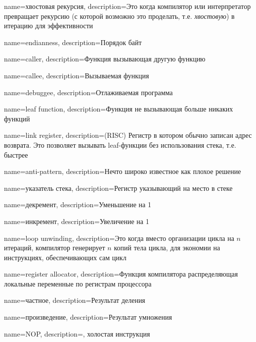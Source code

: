 {
  name=хвостовая рекурсия,
  description={Это когда компилятор или интерпретатор превращает рекурсию 
  (с которой возможно это проделать, т.е. \emph{хвостовую}) в итерацию для эффективности}
}

{
  name=endianness,
  description={Порядок байт}
}

{
  name=caller,
  description={Функция вызывающая другую функцию}
}

{
  name=callee,
  description={Вызываемая функция}
}

{
  name=debuggee,
  description={Отлаживаемая программа}
}

{
  name=leaf function,
  description={Функция не вызывающая больше никаких функций}
}

{
  name=link register,
  description=(RISC) {Регистр в котором обычно записан адрес возврата.
  Это позволяет вызывать leaf-функции без использования стека, т.е. быстрее}
}

{
  name=anti-pattern,
  description={Нечто широко известное как плохое решение}
}

{
  name=указатель стека,
  description={Регистр указывающий на место в стеке}
}

{
  name=декремент,
  description={Уменьшение на 1}
}

{
  name=инкремент,
  description={Увеличение на 1}
}

{
  name=loop unwinding,
  description={Это когда вместо организации цикла на $n$ итераций, компилятор генерирует $n$ копий тела
  цикла, для экономии на инструкциях, обеспечивающих сам цикл}
}

{
  name=register allocator,
  description={Функция компилятора распределяющая локальные переменные по регистрам процессора}
}

{
  name=частное,
  description={Результат деления}
}

{
  name={произведение},
  description={Результат умножения}
}

{
  name=NOP,
  description={, холостая инструкция}
}

